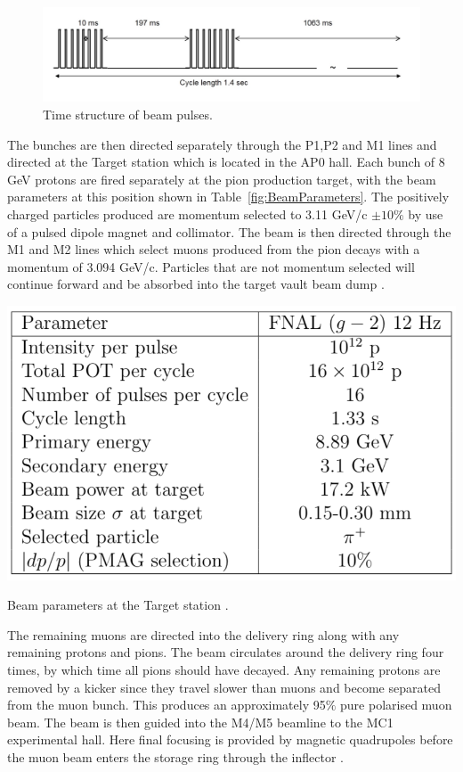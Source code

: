 \begin{figure}[th]
\centering
\includegraphics[scale=0.6]{Figures/beampulses}
\decoRule
\caption{Time structure of beam pulses.}
\label{fig:beampulses}
\end{figure}

The bunches are then directed separately through the P1,P2 and M1 lines and directed at the Target station which is located in the AP0 hall. Each bunch of 8 GeV protons are fired separately at the pion production target, with the beam parameters at this position shown in Table~\ref{fig:BeamParameters}. The positively charged particles produced are momentum selected to 3.11 GeV/c $\pm 10\%$ by use of a pulsed dipole magnet and collimator. The beam is then directed through the M1 and M2 lines which select muons produced from the pion decays with a momentum of 3.094 GeV/c. Particles that are not momentum selected will continue forward and be absorbed into the target vault beam dump \cite{Chap2Ref1}.


\begin{table}[th]
\centering
\includegraphics[scale=0.5]{Figures/BeamParameters}
\decoRule
\caption{Beam parameters at the Target station \cite{Reference29}.}
\label{fig:BeamParameters}
\end{table}

The remaining muons are directed into the delivery ring along with any remaining protons and pions. The beam circulates around the delivery ring four times, by which time all pions should have decayed. Any remaining protons are removed by a kicker since they travel slower than muons and become separated from the muon bunch. This produces an approximately 95$\%$ pure polarised muon beam. The beam is then guided into the M4/M5 beamline to the MC1 experimental hall. Here final focusing is provided by magnetic quadrupoles before the muon beam enters the storage ring through the inflector \cite{Reference22}. 

